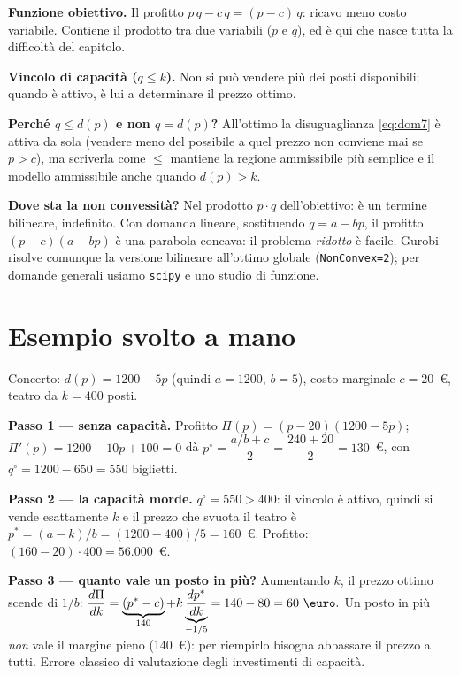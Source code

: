 \begin{spiegazione}
\textbf{Funzione obiettivo.} Il profitto $p\,q - c\,q = (p - c)\,q$: ricavo meno
costo variabile. Contiene il prodotto tra due variabili ($p$ e $q$), ed è qui che
nasce tutta la difficoltà del capitolo.

\textbf{Vincolo di capacità ($q \le k$).} Non si può vendere più dei posti
disponibili; quando è attivo, è lui a determinare il prezzo ottimo.

\textbf{Perché $q \le d(p)$ e non $q = d(p)$?} All'ottimo la disuguaglianza
\eqref{eq:dom7} è attiva da sola (vendere meno del possibile a quel prezzo non
conviene mai se $p > c$), ma scriverla come $\le$ mantiene la regione ammissibile
più semplice e il modello ammissibile anche quando $d(p) > k$.

\textbf{Dove sta la non convessità?} Nel prodotto $p \cdot q$ dell'obiettivo: è un
termine bilineare, indefinito. Con domanda lineare, sostituendo $q = a - bp$, il
profitto $(p-c)(a-bp)$ è una parabola concava: il problema \emph{ridotto} è facile.
Gurobi risolve comunque la versione bilineare all'ottimo globale
(\texttt{NonConvex=2}); per domande generali usiamo \texttt{scipy} e uno studio di
funzione.
\end{spiegazione}

\section{Esempio svolto a mano}

\begin{esempio}
Concerto: $d(p) = 1200 - 5p$ (quindi $a = 1200$, $b = 5$), costo marginale $c = 20$~\euro, teatro da $k = 400$ posti.

\textbf{Passo 1 — senza capacità.} Profitto
$\Pi(p) = (p - 20)(1200 - 5p)$; $\Pi'(p) = 1200 - 10p + 100 = 0$
dà $p^\circ = \dfrac{a/b + c}{2} = \dfrac{240 + 20}{2} = 130$~\euro,
con $q^\circ = 1200 - 650 = 550$ biglietti.

\textbf{Passo 2 — la capacità morde.} $q^\circ = 550 > 400$: il vincolo è attivo,
quindi si vende esattamente $k$ e il prezzo che svuota il teatro è
$p^* = (a - k)/b = (1200 - 400)/5 = 160$~\euro. Profitto:
$(160 - 20)\cdot 400 = 56.000$~\euro.

\textbf{Passo 3 — quanto vale un posto in più?} Aumentando $k$, il prezzo ottimo
scende di $1/b$: $\dfrac{d\Pi}{dk} = \underbrace{(p^* - c)}_{140}
+ k \underbrace{\dfrac{dp^*}{dk}}_{-1/5} = 140 - 80 = 60~\text{\euro}.$
Un posto in più \emph{non} vale il margine pieno (140~\euro): per riempirlo bisogna
abbassare il prezzo a tutti. Errore classico di valutazione degli investimenti di
capacità.
\end{esempio}

